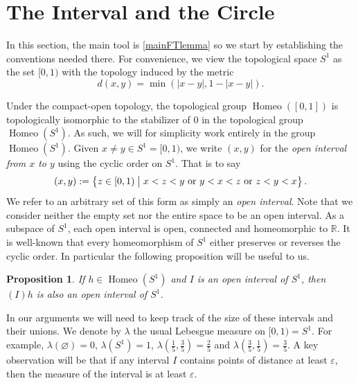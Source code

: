 \documentclass[11pt]{amsart}
\makeatletter
\newtheorem{prop}[theorem]{Proposition}
\newcommand{\makeset}[2]{\left\lbrace #1 \;\middle|\;
 \begin{tabular}{@{}l@{}}
   #2
  \end{tabular}
  \right\rbrace}
\makeatother
\begin{document}
\section{The Interval and the Circle}
In this section, the main tool is \cref{mainFTlemma} so we start by establishing the conventions needed there.
For convenience, we view the topological space \(S^1\) as the set \([0,1)\) with the topology induced by the metric 
\[d(x,y)=\operatorname{min}(|x-y|,1-|x-y|).\]

Under the compact-open topology, the topological group $\operatorname{Homeo}([0,1])$ is topologically isomorphic to the stabilizer of $0$ in the topological group $\operatorname{Homeo}(S^1)$.
As such, we will for simplicity work entirely in the group \(\operatorname{Homeo}(S^1)\).
Given \(x\neq y\in S^1=[0,1)\), we write \((x,y)\) for the \emph{open interval from \(x\) to \(y\)} using the cyclic order on \(S^1\). That is to say
\[(x,y):=\makeset{z\in [0,1)}{\(x<z<y\) or \(y<x<z\) or \(z<y<x\)}.\]
We refer to an arbitrary set of this form as simply an \emph{open interval}. Note that we consider neither the empty set nor the entire space to be an open interval.
As a subspace of \(S^1\), each open interval is open, connected and homeomorphic to \(\mathbb{R}\).
It is well-known that every homeomorphism of \(S^1\) either preserves or reverses the cyclic order. In particular the following proposition will be useful to us.
\begin{prop}\label{interval-preserve}
    If \(h\in \operatorname{Homeo}(S^1)\) and \(I\) is an open interval of \(S^1\), then \((I)h\) is also an open interval of \(S^1\).
\end{prop}

In our arguments we will need to keep track of the size of these intervals and their unions.
    We denote by \(\lambda\) the usual Lebesgue measure on \([0,1)=S^1\). For example, \(\lambda(\varnothing)=0\), \(\lambda(S^1)=1\),  \(\lambda(\frac{1}{5}, \frac{3}{5})=\frac{2}{5}\) and \(\lambda(\frac{3}{5}, \frac{1}{5})=\frac{3}{5}\). A key observation will be that if any interval \(I\) contains points of distance at least \(\varepsilon\), then the measure of the interval is at least \(\varepsilon\).
\end{document}
